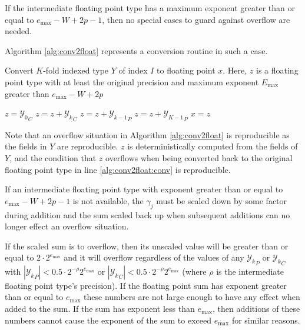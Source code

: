     If the intermediate floating point type has a maximum exponent greater than or equal to $e_{\max} - W + 2  p - 1$, then no special cases to guard against overflow are needed.

    Algorithm \ref{alg:conv2float} represents a conversion routine in such a case.

    \begin{samepage}
    \begin{alg}
      Convert $K$-fold indexed type $Y$ of index $I$ to floating point $x$. Here, $z$ is a floating point type with at least the original precision and maximum exponent $E_{\max}$ greater than $e_{\max} - W + 2  p$
      \begin{algorithmic}[1]
          \State $z = {\mathcal{Y}_0}_C$
            \State $z = z + {\mathcal{Y}_k}_C$
            \State $z = z + {\mathcal{Y}_{k - 1}}_P$
          \EndFor
          \State $z = z + {\mathcal{Y}_{K - 1}}_P$
          \State $x = z$ \label{alg:conv2float:conv}
        \EndFunction
      \end{algorithmic}
      \label{alg:conv2float}
    \end{alg}
    \end{samepage}

    Note that an overflow situation in Algorithm \ref{alg:conv2float} is reproducible as the fields in $Y$ are reproducible. $z$ is deterministically computed from the fields of $Y$, and the condition that $z$ overflows when being converted back to the original floating point type in line \ref{alg:conv2float:conv} is reproducible.

    If an intermediate floating point type with exponent greater than or equal to $e_{\max} - W + 2  p - 1$ is not available, the $\gamma_j$ must be scaled down by some factor during addition and the sum scaled back up when subsequent additions can no longer effect an overflow situation.

    If the scaled sum is to overflow, then its unscaled value will be greater than or equal to $2 \cdot 2^{e_{\max}}$ and it will overflow regardless of the values of any ${\mathcal{Y}_k}_P$ or ${\mathcal{Y}_k}_C$ with $|{\mathcal{Y}_k}_P| < 0.5 \cdot 2^{-\rho} 2^{e_{\max}}$ or $|{\mathcal{Y}_k}_C| < 0.5 \cdot 2^{-\rho}2^{e_{\max}}$ (where $\rho$ is the intermediate floating point type's precision). If the floating point sum has exponent greater than or equal to $e_{\max}$ these numbers are not large enough to have any effect when added to the sum. If the sum has exponent less than $e_{\max}$, then additions of these numbers cannot cause the exponent of the sum to exceed $e_{\max}$ for similar reasons.


